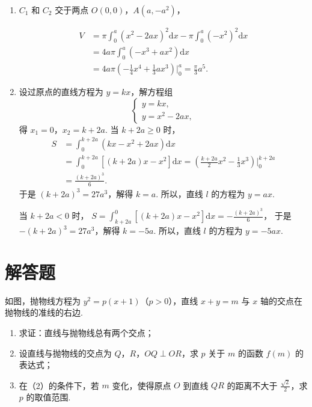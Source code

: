 \documentclass[UTF8,a4paper,oneside,11pt]{ctexbook}
\begin{document}
\begin{solution}

\begin{enumerate}
\item \(C_1\) 和 \(C_2\) 交于两点 \(O(0,0)\)，\(A(a,-a^2)\)，

\[
\begin{aligned}
V&=\pi \int_0^a (x^2-2ax)^2 \mathrm{d}x-\pi \int_0^a (-x^2)^2 \mathrm{d}x \\
&=4a\pi \int_0^a (-x^3+ax^2) \mathrm{d}x \\
&=4a\pi \left(-\frac{1}{4}x^4+\frac{1}{3}ax^3\right)\Bigg|_0^a=\frac{\pi}{3}a^5.
\end{aligned}
\]
\item 设过原点的直线方程为 \(y=kx\)，解方程组
\[
\begin{cases}
y=kx,\\
y=x^2-2ax,
\end{cases}
\]
得 \(x_1=0\)，\(x_2=k+2a\). 当 \(k+2a \geqslant 0\) 时，
\[
\begin{aligned}
S&=\int_0^{k+2a} (kx-x^2+2ax) \mathrm{d}x \\
&=\int_0^{k+2a} \left[(k+2a)x-x^2\right] \mathrm{d}x
=\left(\frac{k+2a}{2}x^2-\frac{1}{3}x^3\right)\Bigg|_0^{k+2a} \\
&=\frac{(k+2a)^3}{6}.
\end{aligned}
\]
于是 \((k+2a)^3=27a^3\)，解得 \(k=a\). 所以，直线 \(l\) 的方程为 \(y=ax\).

当 \(k+2a<0\) 时，
\(S=\int_{k+2a}^0 \left[(k+2a)x-x^2\right] \mathrm{d}x=-\frac{(k+2a)^3}{6}\)，
于是 \(-(k+2a)^3=27a^3\)，解得 \(k=-5a\). 所以，直线 \(l\) 的方程为 \(y=-5ax\).
\end{enumerate}
\end{solution}

\section{解答题}

\begin{problem}
如图，抛物线方程为 \(y^2=p(x+1)\)（\(p>0\)），直线 \(x+y=m\) 与 \(x\) 轴的交点在抛物线的准线的右边.

\begin{enumerate}
\item 求证：直线与抛物线总有两个交点；
\item 设直线与抛物线的交点为 \(Q\)，\(R\)，\(OQ\perp OR\)，求 \(p\) 关于 \(m\) 的函数 \(f(m)\) 的表达式；
\item 在（2）的条件下，若 \(m\) 变化，使得原点 \(O\) 到直线 \(QR\) 的距离不大于 \(\frac{\sqrt{2}}{2}\)，求 \(p\) 的取值范围.
\end{enumerate}

\FloatBarrier
\end{problem}
\end{document}
